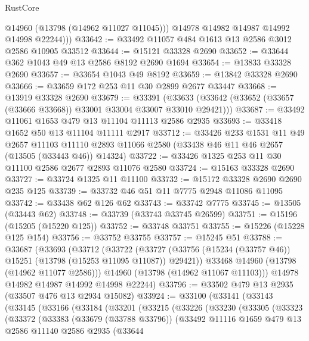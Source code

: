 \begin{lexlean}{RustCore}
\begin{coremodule}
            @14960
            (@13798 (@14962 @11027 @11045)))
          @14978
          @14982
          @14987
          @14992
          @14998
          @22244)))
@33642 := @33492 @11057 @484 @1613 @13 @2586 @3012 @2586 @10905 @33512
@33644 := @15121 @33328 @2690
@33652 := @33644 @362 @1043 @49 @13 @2586 @8192 @2690 @1694
@33654 := @13833 @33328 @2690
@33657 := @33654 @1043 @49 @8192
@33659 := @13842 @33328 @2690
@33666 := @33659 @172 @253 @11 @30 @2899 @2677 @33447
@33668 := @13919 @33328 @2690
@33679 := @33391
    (@33633 (@33642 (@33652 (@33657 (@33666 @33668)) @33001 @33004 @33007 @33010 @29421)))
@33687 := @33492 @11061 @1653 @479 @13 @11104 @11113 @2586 @2935
@33693 := @33418 @1652 @50 @13 @11104 @11111 @2917
@33712 := @33426
    @233
    @1531
    @11
    @49
    @2657
    @11103
    @11110
    @2893
    @11066
    @2580
    (@33438 @46 @11 @46 @2657 (@13505 (@33443 @46)) @14324)
@33722 := @33426 @1325 @253 @11 @30 @11100 @2586 @2677 @2893 @11076 @2580
@33724 := @15163 @33328 @2690
@33727 := @33724 @1325 @11 @11100
@33732 := @15172 @33328 @2690 @2690 @235 @125
@33739 := @33732 @46 @51 @11 @7775 @2948 @11086 @11095
@33742 := @33438 @62 @126 @62
@33743 := @33742 @7775
@33745 := @13505 (@33443 @62)
@33748 := @33739 (@33743 @33745 @26599)
@33751 := @15196 (@15205 (@15220 @125))
@33752 := @33748 @33751
@33755 := @15226 (@15228 @125 @154)
@33756 := @33752 @33755
@33757 := @15245 @51
@33788 := @33687
    (@33693
      (@33712
        (@33722
          (@33727 (@33756 (@15234 (@33757 @46)) @15251 (@13798 (@15253 @11095 @11087)) @29421))
          @33468
          @14960
          (@13798 (@14962 @11077 @2586)))
        @14960
        (@13798 (@14962 @11067 @11103)))
      @14978
      @14982
      @14987
      @14992
      @14998
      @22244)
@33796 := @33502 @479 @13 @2935 (@33507 @476 @13 @2934 @15082)
@33924 := @33100
    (@33141
      (@33143
        (@33145
          (@33166
            (@33184
              (@33201
                (@33215
                  (@33226
                    (@33230
                      (@33305
                        (@33323
                          (@33372
                            (@33383
                              (@33679 (@33788 @33796))
                              (@33492
                                @11116
                                @1659
                                @479
                                @13
                                @2586
                                @11140
                                @2586
                                @2935
                                (@33644

\end{coremodule}
\end{lexlean}

